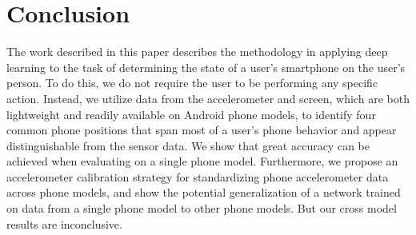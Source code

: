 \section{Conclusion}
The work described in this paper describes the methodology in applying deep learning to the task of determining the state of a user's smartphone on the user's person. 
To do this, we do not require the user to be performing any specific action.
Instead, we utilize data from the accelerometer and screen, which are both lightweight and readily available on Android phone models, to identify four common phone positions that span most of a user's phone behavior
and appear distinguishable from the sensor data. 
We show that great accuracy can be achieved when evaluating on a single phone model.
Furthermore, we propose an accelerometer calibration strategy for standardizing phone accelerometer
data across phone models, and show the potential generalization of a network trained on data from a single phone model to other phone models. But our cross model results are inconclusive.